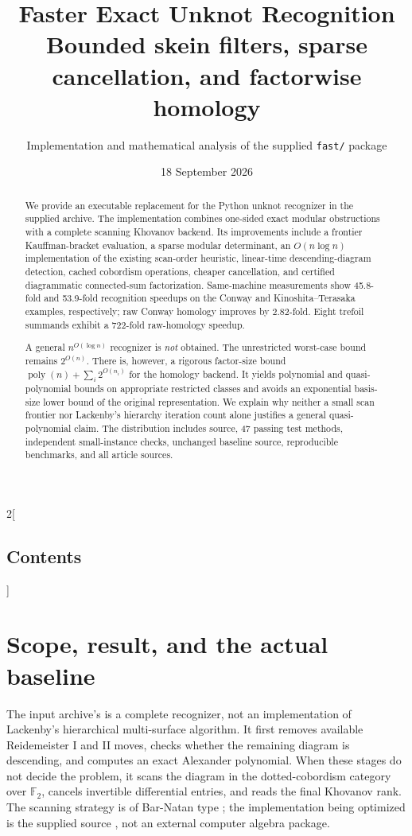 \documentclass[11pt,letterpaper]{article}
\title{Faster Exact Unknot Recognition\\[5pt]
\large Bounded skein filters, sparse cancellation, and factorwise homology}
\author{Implementation and mathematical analysis of the supplied \texttt{fast/} package}
\date{18 September 2026}
\theoremstyle{definition}
\newcommand{\F}{\mathbb F_2}
\newcommand{\poly}{\operatorname{poly}}
\begin{document}
\maketitle
\begin{abstract}
We provide an executable replacement for the Python unknot recognizer in the
supplied archive. The implementation combines one-sided exact modular
obstructions with a complete scanning Khovanov backend. Its improvements include
a frontier Kauffman-bracket evaluation, a sparse modular determinant, an
$O(n\log n)$ implementation of the existing scan-order heuristic, linear-time
descending-diagram detection, cached cobordism operations, cheaper cancellation,
and certified diagrammatic connected-sum factorization. Same-machine measurements
show 45.8-fold and 53.9-fold recognition speedups on the Conway and
Kinoshita--Terasaka examples, respectively; raw Conway homology improves by
2.82-fold. Eight trefoil summands exhibit a 722-fold raw-homology speedup.

A general $n^{O(\log n)}$ recognizer is \emph{not} obtained. The unrestricted
worst-case bound remains $2^{O(n)}$. There is, however, a rigorous factor-size
bound $\poly(n)+\sum_i2^{O(n_i)}$ for the homology backend. It yields polynomial
and quasi-polynomial bounds on appropriate restricted classes and avoids an
exponential basis-size lower bound of the original representation. We explain
why neither a small scan frontier nor Lackenby's hierarchy iteration count alone
justifies a general quasi-polynomial claim. The distribution includes source,
47 passing test methods, independent small-instance checks, unchanged baseline
source, reproducible benchmarks, and all article sources.
\end{abstract}
\begin{multicols}{2}[\subsection*{Contents}]
\small\setlength{\parskip}{0pt}
\makeatletter{}\makeatother
\end{multicols}
\clearpage

\section[Scope and baseline]{Scope, result, and the actual baseline}

The input archive's  is a complete recognizer, not an
implementation of Lackenby's hierarchical multi-surface algorithm. It first
removes available Reidemeister I and II moves, checks whether the remaining
diagram is descending, and computes an exact Alexander polynomial. When these
stages do not decide the problem, it scans the diagram in the dotted-cobordism
category over $\F$, cancels invertible differential entries, and reads the final
Khovanov rank. The scanning strategy is of Bar-Natan type
\cite{barnatan}; the implementation being optimized is the supplied source
\cite{archive}, not an external computer algebra package.
\end{document}
